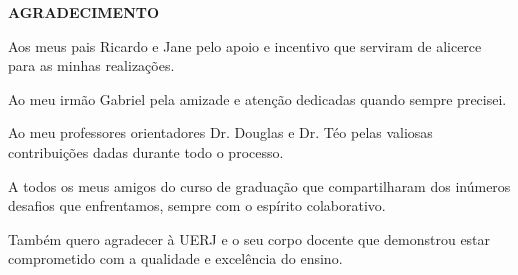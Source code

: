\begin{center}
\textbf{AGRADECIMENTO}
\end{center}

$\!$\\

Aos meus pais Ricardo e Jane pelo apoio e incentivo que serviram de alicerce para as minhas realizações.

Ao meu irmão Gabriel pela amizade e atenção dedicadas quando sempre precisei.

Ao meu professores orientadores Dr. Douglas e Dr. Téo pelas valiosas contribuições dadas durante todo o processo.

A todos os meus amigos do curso de graduação que compartilharam dos inúmeros desafios que enfrentamos, sempre com o espírito colaborativo.

Também quero agradecer à UERJ e o seu corpo docente que demonstrou estar comprometido com a qualidade e excelência do ensino.